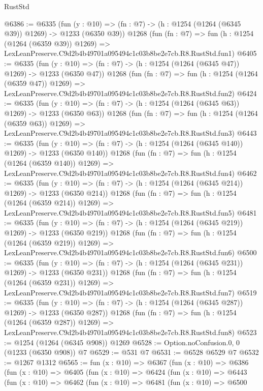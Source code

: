 \begin{lexlean}{RustStd}
\begin{coremodule}
@6386 := @6335
    (fun (y : @10) => (fn : @7) -> (h : @1254 (@1264 (@6345 @39)) @1269) -> @1233 (@6350 @39))
    @1268
    (fun (fn : @7) =>
    fun (h : @1254 (@1264 (@6359 @39)) @1269) =>
    LexLeanPreserve.C9d2b4b49701a095494c1c03b8be2e7cb.R8.RustStd.fun1)
@6405 := @6335
    (fun (y : @10) => (fn : @7) -> (h : @1254 (@1264 (@6345 @47)) @1269) -> @1233 (@6350 @47))
    @1268
    (fun (fn : @7) =>
    fun (h : @1254 (@1264 (@6359 @47)) @1269) =>
    LexLeanPreserve.C9d2b4b49701a095494c1c03b8be2e7cb.R8.RustStd.fun2)
@6424 := @6335
    (fun (y : @10) => (fn : @7) -> (h : @1254 (@1264 (@6345 @63)) @1269) -> @1233 (@6350 @63))
    @1268
    (fun (fn : @7) =>
    fun (h : @1254 (@1264 (@6359 @63)) @1269) =>
    LexLeanPreserve.C9d2b4b49701a095494c1c03b8be2e7cb.R8.RustStd.fun3)
@6443 := @6335
    (fun (y : @10) => (fn : @7) -> (h : @1254 (@1264 (@6345 @140)) @1269) -> @1233 (@6350 @140))
    @1268
    (fun (fn : @7) =>
    fun (h : @1254 (@1264 (@6359 @140)) @1269) =>
    LexLeanPreserve.C9d2b4b49701a095494c1c03b8be2e7cb.R8.RustStd.fun4)
@6462 := @6335
    (fun (y : @10) => (fn : @7) -> (h : @1254 (@1264 (@6345 @214)) @1269) -> @1233 (@6350 @214))
    @1268
    (fun (fn : @7) =>
    fun (h : @1254 (@1264 (@6359 @214)) @1269) =>
    LexLeanPreserve.C9d2b4b49701a095494c1c03b8be2e7cb.R8.RustStd.fun5)
@6481 := @6335
    (fun (y : @10) => (fn : @7) -> (h : @1254 (@1264 (@6345 @219)) @1269) -> @1233 (@6350 @219))
    @1268
    (fun (fn : @7) =>
    fun (h : @1254 (@1264 (@6359 @219)) @1269) =>
    LexLeanPreserve.C9d2b4b49701a095494c1c03b8be2e7cb.R8.RustStd.fun6)
@6500 := @6335
    (fun (y : @10) => (fn : @7) -> (h : @1254 (@1264 (@6345 @231)) @1269) -> @1233 (@6350 @231))
    @1268
    (fun (fn : @7) =>
    fun (h : @1254 (@1264 (@6359 @231)) @1269) =>
    LexLeanPreserve.C9d2b4b49701a095494c1c03b8be2e7cb.R8.RustStd.fun7)
@6519 := @6335
    (fun (y : @10) => (fn : @7) -> (h : @1254 (@1264 (@6345 @287)) @1269) -> @1233 (@6350 @287))
    @1268
    (fun (fn : @7) =>
    fun (h : @1254 (@1264 (@6359 @287)) @1269) =>
    LexLeanPreserve.C9d2b4b49701a095494c1c03b8be2e7cb.R8.RustStd.fun8)
@6523 := @1254 (@1264 (@6345 @908)) @1269
@6528 := Option.noConfusion.{0, 0} (@1233 (@6350 @908)) @7
@6529 := @531 @7
@6531 := @6528 @6529 @7
@6532 := @1267 @1312
@6565 := fun (x : @10) =>
  @6367
    (fun (x : @10) =>
    @6386
      (fun (x : @10) =>
      @6405
        (fun (x : @10) =>
        @6424
          (fun (x : @10) =>
          @6443
            (fun (x : @10) =>
            @6462
              (fun (x : @10) =>
              @6481
                (fun (x : @10) =>
                @6500

\end{coremodule}
\end{lexlean}
